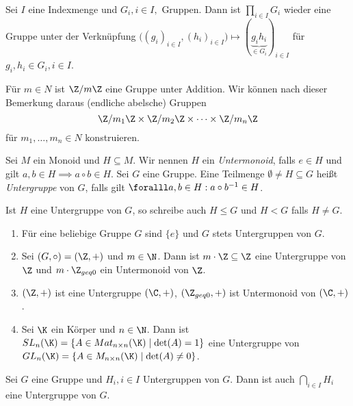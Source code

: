 \begin{rem*}
	Sei $ I $ eine Indexmenge und $ G_i, i \in I, $ Gruppen. Dann ist $ \prod_{i \in I} G_i $ wieder eine Gruppe unter der Verknüpfung $ \big((g_i)_{i \in I}, (h_i)_{i \in I}\big) \mapsto (\underbrace{g_i h_i}_{\in G_i})_{i \in I} $ für $ g_i,h_i \in G_i, i \in I $.
\end{rem*}

\begin{exmp*}
	Für $ m \in N $ ist $ \Z / m\Z $ eine Gruppe unter Addition. Wir können nach dieser Bemerkung daraus (endliche abelsche) Gruppen
	\[ \Z/m_1\Z \times \Z/m_2\Z \times \dots \times \Z/m_n\Z \]
	für $ m_1, \dotsc, m_n \in N $ konstruieren.
\end{exmp*}

\begin{defn*}  
	Sei $M$ ein Monoid und $ H \subseteq M $. Wir nennen $H$ ein \emph{Untermonoid}, falls $ e \in H $ und gilt $ a,b \in H \implies a \circ b \in H $. Sei $G$ eine Gruppe. Eine Teilmenge $ \emptyset \neq H \subseteq G $ heißt \emph{Untergruppe} von $G$, falls gilt $ \foralll a,b \in H: a \circ b^{-1} \in H $.
\end{defn*}

\begin{notat*}
	Ist $H$ eine Untergruppe von $G$, so schreibe auch $H \leq G$ und $H < G$ falls $ H \neq G $.
\end{notat*}

\begin{exmp*}
	\begin{enumerate}[label=\textcircled{\alph*}]
		\item Für eine beliebige Gruppe $G$ sind $\{e\}$ und $G$ stets Untergruppen von $G$.
		\item Sei $ (G,\circ) = (\Z,+) $ und $m \in \N$. Dann ist $ m \cdot \Z \subseteq \Z $ eine Untergruppe von $\Z$ und $ m \cdot \Z_{geq 0} $ ein Untermonoid von $\Z$.
		\item $ (\Z,+) $ ist eine Untergruppe $ (\C,+) $, $(\Z_{geq 0},+)$ ist Untermonoid von $(\C,+)$.
		\item Sei $\K$ ein Körper und $n \in \N$. Dann ist $ SL_n(\K) = \{A \in Mat_{n \times n}(\K) \mid \det(A) = 1\} $ eine Untergruppe von $ GL_n(\K) = \{A \in M_{n \times n}(\K) \mid \det(A) \neq 0\} $.
	\end{enumerate}
\end{exmp*}

\begin{rem*}
	Sei $G$ eine Gruppe und $ H_i, i \in I $ Untergruppen von $G$. Dann ist auch $ \bigcap_{i \in I} H_i $ eine Untergruppe von $G$.
\end{rem*}